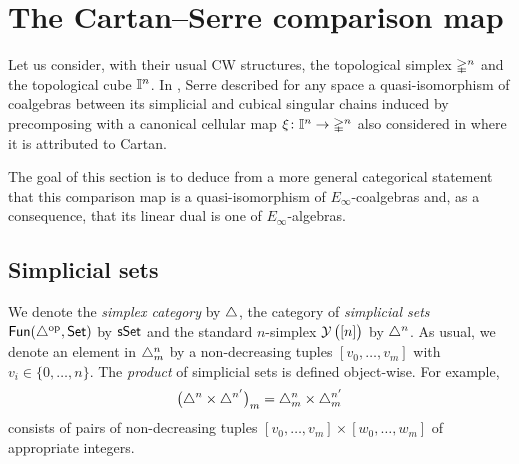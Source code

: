 
\section{The Cartan--Serre comparison map} \label{s:the cartan-serre comparison map}

Let us consider, with their usual CW structures, the topological simplex $\mathbb{\Delta}^n$
and the topological cube $\mathbb{I}^n$.
In \cite[p. 442]{serre1951homologie}, Serre described for any space a quasi-isomorphism of coalgebras between its simplicial and cubical singular chains induced by precomposing with a canonical cellular map $\operatorname{\xi} \colon \mathbb{I}^n \to \mathbb{\Delta}^n$ also considered in \cite[p.199]{eilenberg1953acyclic} where it is attributed to Cartan.



The goal of this section is to deduce from a more general categorical statement that this comparison map is a quasi-isomorphism of $E_\infty$-coalgebras and, as a consequence, that its linear dual is one of $E_\infty$-algebras.

\subsection{Simplicial sets}

We denote the \textit{simplex category} by $\triangle$, the category of \textit{simplicial sets} $\mathsf{Fun}(\triangle^{\mathrm{op}}, \mathsf{Set})$ by $\mathsf{sSet}$ and the standard $n$-simplex $\operatorname{\mathcal{Y}}\big( [n] \big)$ by $\triangle^n$.
As usual, we denote an element in $\triangle^n_m$ by a non-decreasing tuples $[v_0, \dots, v_m]$ with $v_i \in \{0, \dots, n\}$.
The \textit{product} of simplicial sets is defined object-wise.
For example,
\[
\big(\triangle^n \times \triangle^{n^\prime}\big)_m = \triangle^n_m \times \triangle^{n^\prime}_m
\]
consists of pairs of non-decreasing tuples $[v_0, \dots, v_m] \times [w_0, \dots, w_m]$ of appropriate integers.

